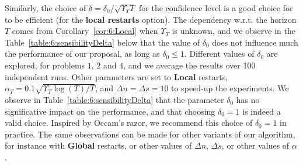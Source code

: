 Similarly, the choice of $\delta=\delta_0 / \sqrt{\Upsilon_T T}$ for the confidence level is a good choice for \GLRklUCB{} to be efficient (for the \textbf{local restarts} option).
The dependency w.r.t. the horizon $T$ comes from Corollary~\ref{cor:6:Local} when $\Upsilon_T$ is unknown, and we observe in the Table~\ref{table:6:sensibilityDelta} below that the value of $\delta_0$ does not influence much the performance of our proposal, as long as $\delta_0\leq1$.
Different values of $\delta_0$ are explored, for problems $1$, $2$ and $4$, and we average the results over $100$ independent runs.
Other parameters are set to \textbf{Local} restarts, $\alpha_T = 0.1 \sqrt{\Upsilon_T\log(T)/T}$, and $\Delta n = \Delta s = 10$ to speed-up the experiments.
%
We observe in Table~\ref{table:6:sensibilityDelta} that the parameter $\delta_0$ has no significative impact on the performance,
and that choosing $\delta_0 = 1$ is indeed a valid choice.
Inspired by Occam's razor, we recommend this choice of $\delta_0=1$ in practice.
%
The same observations can be made for other variants of our algorithm, for instance with \textbf{Global} restarts, or other values of $\Delta n$, $\Delta s$, or other values of $\alpha$.

